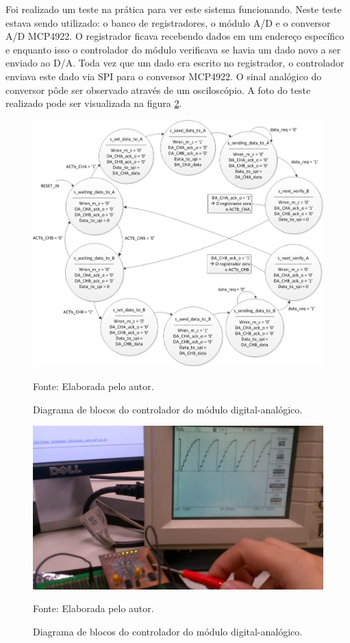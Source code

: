 Foi realizado um teste na prática para ver este sistema funcionando. Neste teste estava sendo utilizado: o banco de registradores, o módulo A/D e o conversor A/D MCP4922. O registrador ficava recebendo dados em um endereço específico e enquanto isso o controlador do módulo verificava se havia um dado novo a ser enviado ao D/A. Toda vez que um dado era escrito no registrador, o controlador enviava este dado via SPI para o conversor MCP4922. O sinal analógico do conversor pôde ser observado através de um osciloscópio. A foto do teste realizado pode ser visualizada na figura \ref{teste_conversor_DAC}.

\begin{figure}[!htb]
	\centering
	\caption{Diagrama de blocos do controlador do módulo digital-analógico.}
	\includegraphics[scale = .9]{Imagens/controlador_DAC}
	
	Fonte: Elaborada pelo autor.
	
	\label{controlador_DAC}
\end{figure}

\begin{figure}[!htb]
	\centering
	\caption{Diagrama de blocos do controlador do módulo digital-analógico.}
	\includegraphics[scale = .7, angle = 90]{Imagens/teste_conversor_DAC}
	
	Fonte: Elaborada pelo autor.
	
	\label{teste_conversor_DAC}
\end{figure}


